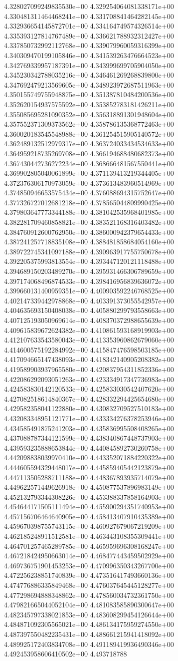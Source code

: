 4.328027099249835530e+00	4.329254064081338171e+00	4.330481311464468241e+00	4.331708841464282145e+00	4.332936654145872701e+00	4.334164749574326514e+00	4.335393127814767489e+00	4.336621788932312427e+00	4.337850732992112768e+00	4.339079960059316399e+00	4.340309470199105846e+00	4.341539263476664523e+00	4.342769339957187391e+00	4.343999699705904050e+00	4.345230342788035216e+00	4.346461269268839800e+00	4.347692479213569605e+00	4.348923972687511963e+00	4.350155749755948875e+00	4.351387810484200536e+00	4.352620154937575592e+00	4.353852783181426211e+00	4.355085695281090352e+00	4.356318891301948604e+00	4.357552371309373562e+00	4.358786135368772463e+00	4.360020183545548988e+00	4.361254515905140572e+00	4.362489132512979317e+00	4.363724033434534633e+00	4.364959218735269708e+00	4.366194688480682373e+00	4.367430442736272234e+00	4.368666481567550441e+00	4.369902805040061899e+00	4.371139413219344405e+00	4.372376306170973059e+00	4.373613483960514969e+00	4.374850946653575434e+00	4.376088694315752647e+00	4.377326727012681218e+00	4.378565044809990425e+00	4.379803647773344188e+00	4.381042535968401985e+00	4.382281709460858821e+00	4.383521168316403482e+00	4.384760912600762950e+00	4.386000942379654433e+00	4.387241257718835108e+00	4.388481858684054160e+00	4.389722745341097188e+00	4.390963917755750678e+00	4.392205375993813554e+00	4.393447120121118488e+00	4.394689150203489270e+00	4.395931466306789659e+00	4.397174068496874533e+00	4.398416956839636072e+00	4.399660131400959351e+00	4.400903592246768525e+00	4.402147339442978868e+00	4.403391373055542957e+00	4.404635693150408038e+00	4.405880299793558663e+00	4.407125193050969614e+00	4.408370372988655639e+00	4.409615839672624382e+00	4.410861593168919903e+00	4.412107633543580043e+00	4.413353960862679060e+00	4.414600575192284992e+00	4.415847476598503185e+00	4.417094665147438093e+00	4.418342140905208382e+00	4.419589903937965580e+00	4.420837954311852336e+00	4.422086292093051263e+00	4.423334917347736983e+00	4.424583830142120533e+00	4.425833030542407620e+00	4.427082518614840367e+00	4.428332294425654680e+00	4.429582358041122880e+00	4.430832709527510183e+00	4.432083348951121771e+00	4.433334276378253946e+00	4.434585491875241203e+00	4.435836995508408265e+00	4.437088787344121599e+00	4.438340867448737903e+00	4.439593235888653844e+00	4.440845892730260758e+00	4.442098838039970410e+00	4.443352071884220322e+00	4.444605594329448017e+00	4.445859405442123879e+00	4.447113505288711188e+00	4.448367893935714079e+00	4.449622571449626918e+00	4.450877537896983149e+00	4.452132793344308226e+00	4.453388337858164903e+00	4.454644171505111494e+00	4.455900294351740953e+00	4.457156706464640905e+00	4.458413407910435389e+00	4.459670398755743115e+00	4.460927679067219209e+00	4.462185248911512581e+00	4.463443108355309441e+00	4.464701257465289785e+00	4.465959696308168247e+00	4.467218424950663014e+00	4.468477443459502929e+00	4.469736751901453253e+00	4.470996350343267700e+00	4.472256238851740839e+00	4.473516417493660136e+00	4.474776886335849468e+00	4.476037645445128277e+00	4.477298694888348862e+00	4.478560034732361750e+00	4.479821665044052104e+00	4.481083585890300647e+00	4.482345797338021853e+00	4.483608299454126644e+00	4.484871092305565021e+00	4.486134175959274550e+00	4.487397550482235431e+00	4.488661215941418092e+00	4.489925172403834708e+00	4.491189419936490346e+00	4.492453958606410502e+00	4.493718788